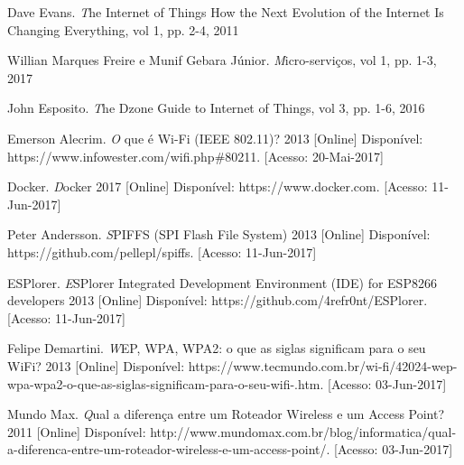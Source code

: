 \documentclass[journal]{IEEEtran}
\begin{document}

%
%
%
\begin{thebibliography}{1}

Dave Evans. \emph The Internet of Things How the Next Evolution of the Internet Is Changing Everything, vol 1, pp. 2-4, 2011

Willian Marques Freire e Munif Gebara Júnior. \emph Micro-serviços, vol 1, pp. 1-3, 2017

John Esposito. \emph The Dzone Guide to Internet of Things, vol 3, pp. 1-6, 2016

Emerson Alecrim. \emph O que é Wi-Fi (IEEE 802.11)? 2013 [Online] Disponível: https://www.infowester.com/wifi.php\#80211. [Acesso: 20-Mai-2017]

Docker. \emph Docker 2017 [Online] Disponível: https://www.docker.com. [Acesso: 11-Jun-2017]

Peter Andersson. \emph SPIFFS (SPI Flash File System) 2013 [Online] Disponível: https://github.com/pellepl/spiffs. [Acesso: 11-Jun-2017]

ESPlorer. \emph ESPlorer Integrated Development Environment (IDE) for ESP8266 developers 2013 [Online] Disponível: https://github.com/4refr0nt/ESPlorer. [Acesso: 11-Jun-2017]

Felipe Demartini. \emph WEP, WPA, WPA2: o que as siglas significam para o seu WiFi? 2013 [Online] Disponível: https://www.tecmundo.com.br/wi-fi/42024-wep-wpa-wpa2-o-que-as-siglas-significam-para-o-seu-wifi-.htm. [Acesso: 03-Jun-2017]

Mundo Max. \emph Qual a diferença entre um Roteador Wireless e um Access Point? 2011 [Online] Disponível: http://www.mundomax.com.br/blog/informatica/qual-a-diferenca-entre-um-roteador-wireless-e-um-access-point/. [Acesso: 03-Jun-2017]


\end{thebibliography}
\end{document}

